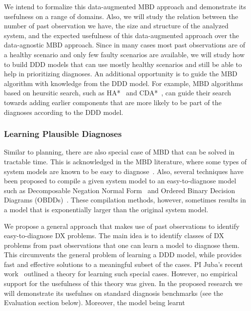 \documentclass[12pt]{article}
\newcommand{\note}[1]{\textbf{\textit{#1}}}
\begin{document}
We intend to formalize this data-augmented MBD approach and demonstrate its usefulness on a range of domains. Also, we will study the relation between the number of past observation we have, the size and structure of the analyzed system, and the expected usefulness of this data-augmented approach over the data-agnostic MBD approach. Since in many cases most past observations are of a healthy scenario and only few faulty scenarios are available, we will study how to build DDD models that can use mostly healthy scenarios and still be able to help in prioritizing diagnoses. An additional opportunity is to guide the MBD algorithm with knowledge from the DDD model. For example, MBD algorithms based on heursitic search, such as HA*~\cite{feldman2006two} and CDA*~\cite{williams2007conflict}, can guide their search towards adding earlier components that are more likely to be part of the diagnoses according to the DDD model. 


\subsubsection{Learning Plausible Diagnoses} 
Similar to planning, there are also special case of MBD that can be solved in tractable time. This is acknowledged in the MBD literature, where some types of system models are known to be easy to diagnose~\cite{horn}. Also, several techniques have been proposed to compile a given system model to an easy-to-diagnose model such as Decomposable Negation Normal Form~\cite{darwiche2001decomposable} and Ordered Binary Decision Diagrams (OBDDs)~\cite{torta2006onTheUse}. These compilation methods, however, sometimes results in a model that is exponentially larger than the original system model. 

We propose a general approach that makes use of past observations to identify easy-to-diagnose DX problems. The main idea is to identify classes of DX problems from past observations that one can learn a model to diagnose them. This circumvents the general problem of learning a DDD model, while provides fast and effective solutions to a meaningful subset of the cases. 
PI Juba's recent work~\cite{juba2016aaai} outlined a theory for learning such special cases. However, no empirical support for the usefulness of this theory was given. In the proposed research we will demonstrate its usefulnes on standard diagnosis benchmarks (see the Evaluation section below). Moreover, the model being learnt
\end{document}
